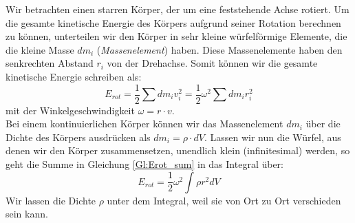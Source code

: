 Wir betrachten einen starren Körper, der um eine feststehende Achse rotiert. Um die gesamte kinetische Energie des Körpers aufgrund seiner Rotation berechnen zu können, unterteilen wir den Körper in sehr kleine würfelförmige Elemente, die die kleine Masse $dm_i$ (\textit{Massenelement}) haben. Diese Massenelemente haben den senkrechten Abstand $r_i$ von der Drehachse. Somit können wir die gesamte kinetische Energie schreiben als:
\begin{equation}
\label{Gl:Erot_sum}
E_{rot} = \frac{1}{2} \sum{dm_i v_i^2} = \frac{1}{2} \omega^2 \sum{dm_i r_i^2}
\end{equation}
mit der Winkelgeschwindigkeit $\omega = r\cdot v$.\\
Bei einem kontinuierlichen Körper können wir das Massenelement $dm_i$ über die Dichte des Körpers ausdrücken als $dm_i = \rho\cdot dV$. Lassen wir nun die Würfel, aus denen wir den Körper zusammensetzen, unendlich klein (infinitesimal) werden, so geht die Summe in Gleichung \ref{Gl:Erot_sum} in das Integral über:
\begin{equation}
\label{Gl:Erot_integral}
E_{rot} = \frac{1}{2}\omega^2\int{\rho r^2 dV}
\end{equation}
%
Wir lassen die Dichte $\rho$ unter dem Integral, weil sie von Ort zu Ort verschieden sein kann. \\


